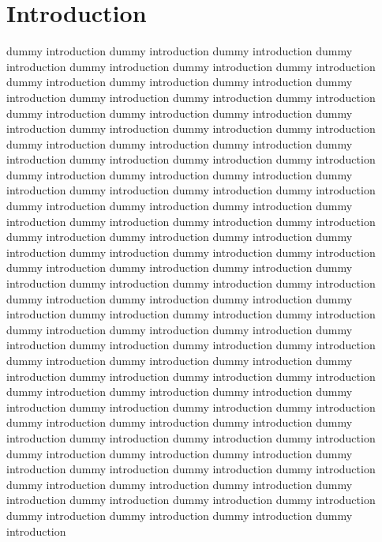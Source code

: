 
\section{Introduction}

 dummy introduction  dummy introduction dummy introduction dummy introduction dummy introduction dummy introduction dummy introduction dummy introduction dummy introduction dummy introduction dummy introduction dummy introduction dummy introduction dummy introduction dummy introduction dummy introduction dummy introduction dummy introduction dummy introduction dummy introduction dummy introduction dummy introduction dummy introduction dummy introduction dummy introduction dummy introduction dummy introduction dummy introduction dummy introduction dummy introduction dummy introduction dummy introduction dummy introduction dummy introduction dummy introduction dummy introduction dummy introduction dummy introduction dummy introduction dummy introduction dummy introduction dummy introduction dummy introduction dummy introduction dummy introduction dummy introduction dummy introduction dummy introduction dummy introduction dummy introduction dummy introduction dummy introduction dummy introduction dummy introduction dummy introduction dummy introduction dummy introduction dummy introduction dummy introduction dummy introduction dummy introduction dummy introduction dummy introduction dummy introduction dummy introduction dummy introduction dummy introduction dummy introduction dummy introduction dummy introduction dummy introduction dummy introduction dummy introduction dummy introduction dummy introduction dummy introduction dummy introduction dummy introduction dummy introduction dummy introduction dummy introduction dummy introduction dummy introduction dummy introduction dummy introduction dummy introduction dummy introduction dummy introduction dummy introduction dummy introduction dummy introduction dummy introduction dummy introduction dummy introduction dummy introduction dummy introduction dummy introduction dummy introduction dummy introduction dummy introduction dummy introduction dummy introduction dummy introduction dummy introduction dummy introduction dummy introduction dummy introduction dummy introduction dummy introduction

\newpage